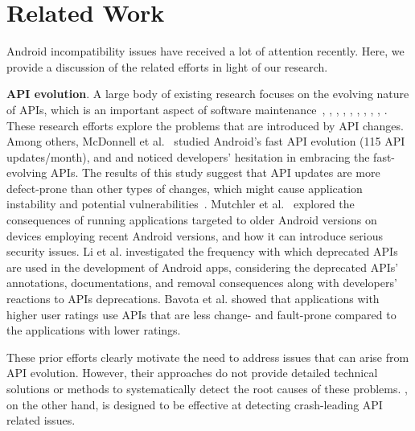 \section{Related Work}\label{sec-related}
\vspace{-0.1cm}
Android incompatibility issues have received a lot of
attention recently. Here, we provide a discussion of the
related efforts in light of our research.

\textbf{API evolution}. A large body of existing research
focuses on the evolving nature of APIs, which is an
important aspect of software
maintenance~\cite{mcdonnell2013empirical},
\cite{bavota2015impact}, \cite{ACRYL_Scalabrino2019}, \cite{li2018characterising},
\cite{lamothe2018exploring}, \cite{linares2013api}, \cite{Luo2018},
\cite{Fazzini:2017:ACI:3155562.3155604},
\cite{mahmoudi2018android}, \cite{mutchler2016target}. These
research efforts  explore the problems that are introduced
by API changes. Among others, McDonnell et
al.~\cite{mcdonnell2013empirical} studied Android's fast API
evolution (115 API updates/month), and and noticed developers'
hesitation in embracing the fast-evolving APIs. The results
of this study suggest that API updates are more defect-prone
than other types of changes, which might cause application
instability and potential vulnerabilities~\cite{linares2013api}.
Mutchler et al.~\cite{mutchler2016target} explored the consequences of
running applications targeted to older Android versions on
devices employing recent Android versions, and how it can
introduce serious security issues. Li et al.
\cite{li2018characterising} investigated the frequency with
which deprecated APIs are used in the development of Android
apps, considering the deprecated APIs' annotations,
documentations, and removal consequences along with
developers' reactions to APIs deprecations. Bavota et al.
\cite{bavota2015impact} showed that applications with higher
user ratings use APIs that are less change- and fault-prone
compared to the applications with lower ratings. 

%


These prior efforts clearly motivate the need to address
issues that can arise from API evolution.  However, their
approaches do not provide detailed technical solutions or
methods to systematically detect the root causes of these
problems.  \textsc{\@approach}, on the other hand, is
designed to be effective at detecting crash-leading API
related issues.

